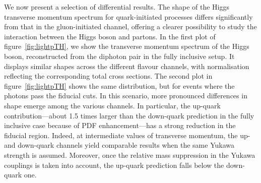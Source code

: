 \documentclass[11pt,a4paper]{article}
\begin{document}
We now present a selection of differential results. The shape of the Higgs transverse momentum spectrum for quark-initiated processes differs significantly from that in the gluon-initiated channel, offering a clearer possibility to study the interaction between the Higgs boson and partons. In the first plot of figure~\ref{fig:lightpTH}, we show the transverse momentum spectrum of the Higgs boson, reconstructed from the diphoton pair in the fully inclusive setup. It displays similar shapes across the different flavour channels, with normalisation reflecting the corresponding total cross sections. The second plot in figure~\ref{fig:lightpTH} shows the same distribution, but for events where the photons pass the fiducial cuts. In this scenario, more pronounced differences in shape emerge among the various channels. In particular, the up-quark contribution—about 1.5 times larger than the down-quark prediction in the fully inclusive case because of PDF enhancement—has a strong reduction in the fiducial region. Indeed, at intermediate values of transverse momentum, the up- and down-quark channels yield comparable results when the same Yukawa strength is assumed. Moreover, once the relative mass suppression in the Yukawa couplings is taken into account, the up-quark prediction falls below the down-quark one.
\end{document}

